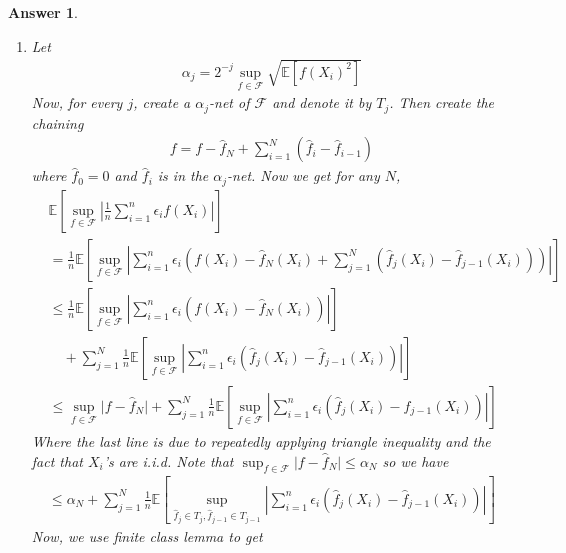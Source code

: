 \documentclass[12pt]{article}
\theoremstyle{colon}
\newtheorem*{answer}{Answer}
\begin{document}
\begin{answer}
  \leavevmode
  \begin{enumerate}[label=\arabic*)]
    \item Let
      \begin{gather*}
        \alpha_j = 2^{-j} \sup_{f \in \mathcal{F}} \sqrt{\mathbb{E}[f(X_i)^2]}
      \end{gather*}
      Now, for every $j$, create a $\alpha_j$-net of $\mathcal{F}$ and denote it by $T_j$. Then create the chaining
      \begin{gather*}
        f = f - \hat{f}_N + \sum_{i=1}^N (\hat{f}_i - \hat{f}_{i-1})
      \end{gather*}
      where $\hat{f}_0 = 0$ and $\hat{f}_i$ is in the $\alpha_j$-net. Now we get for any $N$,
      \begin{align*}
        &\mathbb{E} \left[ \sup_{f \in \mathcal{F}} \left\lvert \frac{1}{n} \sum_{i=1}^n \epsilon_i f(X_i) \right\rvert \right] \\&= \frac{1}{n} \mathbb{E} \left[ \sup_{f \in \mathcal{F}} \left\lvert \sum_{i=1}^n \epsilon_i \left( f(X_i) - \hat{f}_N(X_i) + \sum_{j=1}^N (\hat{f}_j(X_i) - \hat{f}_{j-1}(X_i)) \right) \right\rvert \right] \\
        &\leq \frac{1}{n} \mathbb{E} \left[ \sup_{f \in \mathcal{F}} \left\lvert \sum_{i=1}^n \epsilon_i \left( f(X_i) - \hat{f}_N(X_i) \right) \right\rvert \right] \\
        &\quad + \sum_{j=1}^N \frac{1}{n} \mathbb{E} \left[ \sup_{f \in \mathcal{F}} \left\lvert \sum_{i=1}^n \epsilon_i (\hat{f}_j(X_i) - \hat{f}_{j-1}(X_i)) \right\rvert \right] \\
        &\leq \sup_{f \in \mathcal{F}} \lvert f - \hat{f}_N \rvert + \sum_{j=1}^N \frac{1}{n} \mathbb{E} \left[ \sup_{f \in \mathcal{F}} \left\lvert \sum_{i=1}^n \epsilon_i (\hat{f}_j(X_i) - \hat{f}_{j-1}(X_i)) \right\rvert \right]
      \end{align*}
      Where the last line is due to repeatedly applying triangle inequality and the fact that $X_i$'s are i.i.d. Note that $\sup_{f \in \mathcal{F}} \lvert f - \hat{f}_N \rvert \leq \alpha_N$ so we have
      \begin{gather*}
        \leq \alpha_N + \sum_{j=1}^N \frac{1}{n} \mathbb{E} \left[ \sup_{\hat{f}_j \in T_j, \hat{f}_{j-1} \in T_{j-1}} \left\lvert \sum_{i=1}^n \epsilon_i (\hat{f}_j(X_i) - \hat{f}_{j-1}(X_i)) \right\rvert \right]
      \end{gather*}
      Now, we use finite class lemma to get
      \begin{gather*}

\end{gather*}
\end{enumerate}
\end{answer}
\end{document}
